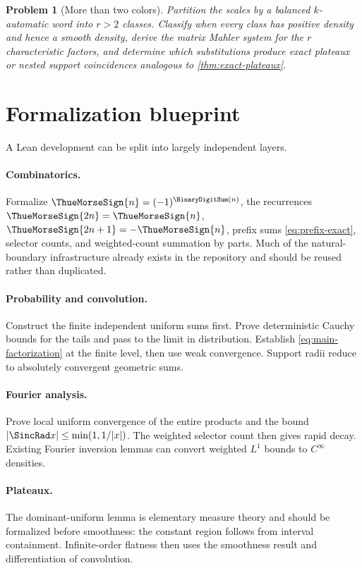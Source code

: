 \documentclass[11pt,oneside]{article}
\numberwithin{equation}{section}
\newtheorem{problem}[theorem]{Problem}
\theoremstyle{definition}
\theoremstyle{remark}
\begin{document}
\begin{problem}[More than two colors]
Partition the scales by a balanced $k$-automatic word into $r>2$ classes.  Classify when
every class has positive density and hence a smooth density, derive the matrix Mahler
system for the $r$ characteristic factors, and determine which substitutions produce
exact plateaux or nested support coincidences analogous to \cref{thm:exact-plateaux}.
\end{problem}

\section{Formalization blueprint}
\label{sec:lean}

A Lean development can be split into largely independent layers.

\paragraph{Combinatorics.}
Formalize $\ThueMorseSign{n}=(-1)^{\BinaryDigitSum(n)}$, the recurrences
$\ThueMorseSign{2n}=\ThueMorseSign{n}$, $\ThueMorseSign{2n+1}=-\ThueMorseSign{n}$, prefix sums \eqref{eq:prefix-exact}, selector counts, and
weighted-count summation by parts.  Much of the natural-boundary infrastructure already
exists in the repository and should be reused rather than duplicated.

\paragraph{Probability and convolution.}
Construct the finite independent uniform sums first.  Prove deterministic Cauchy bounds
for the tails and pass to the limit in distribution.  Establish
\eqref{eq:main-factorization} at the finite level, then use weak convergence.  Support
radii reduce to absolutely convergent geometric sums.

\paragraph{Fourier analysis.}
Prove local uniform convergence of the entire products and the bound
$|\SincRad x|\le\min(1,1/|x|)$.  The weighted selector count then gives rapid decay.  Existing
Fourier inversion lemmas can convert weighted $L^1$ bounds to $C^\infty$ densities.

\paragraph{Plateaux.}
The dominant-uniform lemma is elementary measure theory and should be formalized before
smoothness: the constant region follows from interval containment.  Infinite-order
flatness then uses the smoothness result and differentiation of convolution.
\end{document}
